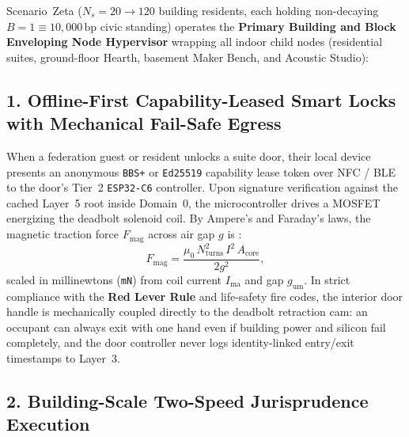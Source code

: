 Scenario~Zeta ($N_s = 20 \to 120$ building residents, each holding non-decaying $B = 1 \equiv 10{,}000\,\mathrm{bp}$ civic standing) operates the \textbf{Primary Building and Block Enveloping Node Hypervisor} wrapping all indoor child nodes (residential suites, ground-floor Hearth, basement Maker Bench, and Acoustic Studio):

\subsection{1. Offline-First Capability-Leased Smart Locks with Mechanical Fail-Safe Egress}

When a federation guest or resident unlocks a suite door, their local device presents an anonymous \texttt{BBS+} or \texttt{Ed25519} capability lease token over NFC / BLE to the door's Tier~2 \texttt{ESP32-C6} controller. Upon signature verification against the cached Layer~5 root inside Domain~0, the microcontroller drives a MOSFET energizing the deadbolt solenoid coil. By Ampere's and Faraday's laws, the magnetic traction force $F_{\mathrm{mag}}$ across air gap $g$ is \parencite{griffiths2005introduction}:
\begin{equation}
    F_{\mathrm{mag}} = \frac{\mu_0\, N_{\mathrm{turns}}^2\, I^2\, A_{\mathrm{core}}}{2 g^2},
    \label{eq:l2-solenoid-force}
\end{equation}
scaled in millinewtons (\texttt{mN}) from coil current $I_{\mathrm{ma}}$ and gap $g_{\mathrm{um}}$. In strict compliance with the \textbf{Red Lever Rule} and life-safety fire codes, the interior door handle is mechanically coupled directly to the deadbolt retraction cam: an occupant can always exit with one hand even if building power and silicon fail completely, and the door controller never logs identity-linked entry/exit timestamps to Layer~3.

\subsection{2. Building-Scale Two-Speed Jurisprudence Execution}

